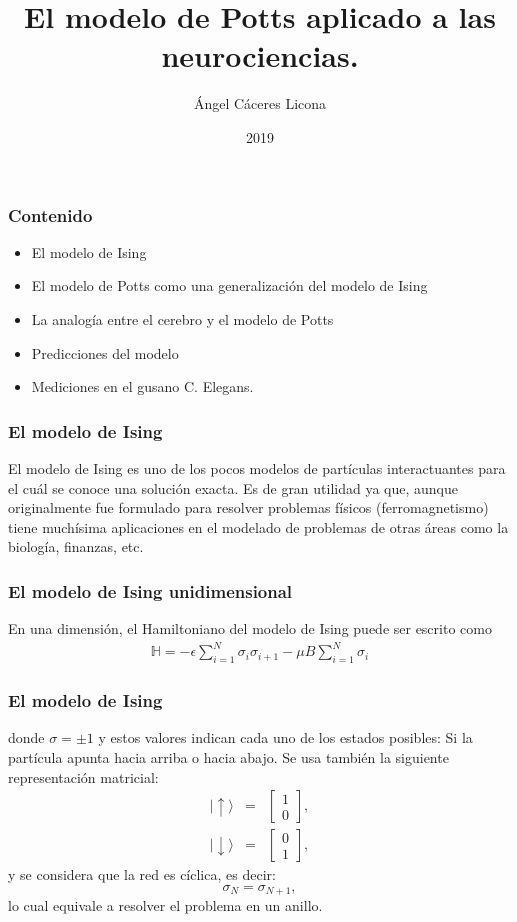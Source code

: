 \documentclass{beamer}
\title{El modelo de Potts aplicado a las neurociencias.}
\author{{Ángel Cáceres Licona}}
\institute{División de Ciencias Naturales e Ingeniería}
\date{2019}
\begin{document}
 
\frame{\titlepage}
 
\begin{frame}
\frametitle{Contenido}
\begin{itemize}
    \item El modelo de Ising
    \item El modelo de Potts como una generalización del modelo de Ising
    \item La analogía entre el cerebro y el modelo de Potts
    \item Predicciones del modelo
    \item Mediciones en el gusano C. Elegans.
  \end{itemize}
\end{frame}

\begin{frame}
\frametitle{El modelo de Ising}

%
El modelo de Ising es uno de los pocos modelos de part\'iculas interactuantes para el cu\'al se conoce una soluci\'on exacta. Es de gran utilidad ya que, aunque originalmente fue formulado para resolver problemas f\'isicos (ferromagnetismo) tiene much\'isima aplicaciones en el modelado de problemas de otras \'areas como la biolog\'ia, finanzas, etc.\\
\end{frame}

\begin{frame}
\frametitle{El modelo de Ising unidimensional}

En una dimensi\'on, el Hamiltoniano del modelo de Ising puede ser escrito como \\
%
\begin{eqnarray}
  \mathbb{H}=-\epsilon\sum_{i=1}^{N}\sigma_i\sigma_{i+1}-\mu B\sum_{i=1}^{N}\sigma_i \label{hamilIsing}
\end{eqnarray}

\end{frame}
\begin{frame}
\frametitle{El modelo de Ising}
%
donde $\sigma=\pm1$ y estos valores indican cada uno de los estados posibles: Si la part\'icula apunta hacia arriba o hacia abajo. Se usa tambi\'en la siguiente representaci\'on matricial:
%
\begin{eqnarray}
  |\uparrow\rangle &=&\begin{bmatrix}1\\0\end{bmatrix}\label{spinup},\\
  |\downarrow\rangle&=&\begin{bmatrix}0\\1\end{bmatrix}\label{spindown},
\end{eqnarray}
%
y se considera que la red es c\'iclica, es decir:
%
$$
\sigma_{N}=\sigma_{N+1},
$$
%
lo cual equivale a resolver el problema en un anillo.
%

\end{frame}
\end{document}
